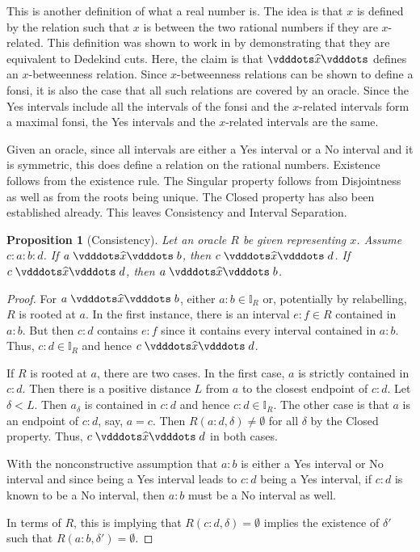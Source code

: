 \documentclass[12pt]{article}
\newtheorem{proposition}{Proposition}[section]
\begin{document}
This is another definition of what a real number is. The idea is that $x$ is defined by the relation such that $x$ is between the two rational numbers if they are $x$-related. This definition was shown to work in \cite{taylor24dedekind} by demonstrating that they are equivalent to Dedekind cuts. Here, the claim is that $\xora$ defines an $x$-betweenness relation. Since $x$-betweenness relations can be shown to define a fonsi, it is also the case that all such relations are covered by an oracle. Since the Yes intervals include all the intervals of the fonsi and the $x$-related intervals form a maximal fonsi, the Yes intervals and the $x$-related intervals are the same. 

Given an oracle, since all intervals are either a Yes interval or a No interval and it is symmetric, this does define a relation on the rational numbers. Existence follows from the existence rule. The Singular property follows from Disjointness as well as from the roots being unique. The Closed property has also been established already. This leaves Consistency and Interval Separation. 

\begin{proposition}[Consistency]
    Let an oracle $R$ be given representing $x$. Assume $c:a:b:d$. If $a \xora b$, then $c \xora d$. If \sout{$c \xora d$}, then \sout{$a \xora b$}. 
\end{proposition}

\begin{proof}
    For $a \xora b$, either $a:b \in \mathbb{I}_R$ or, potentially by relabelling, $R$ is rooted at $a$. In the first instance, there is an interval $e:f \in R$ contained in $a:b$. But then $c:d$ contains $e:f$ since it contains every interval contained in $a:b$. Thus, $c:d \in \mathbb{I}_R$ and hence $c \xora d$. 
    
    If $R$ is rooted at $a$, there are two cases. In the first case, $a$ is strictly contained in $c:d$. Then there is a positive distance $L$ from $a$ to the closest endpoint of $c:d$. Let $\delta < L$. Then $a_\delta$ is contained in $c:d$ and hence $c:d \in \mathbb{I}_R$. The other case is that $a$ is an endpoint of $c:d$, say, $ a= c$. Then $R(a:d, \delta) \neq \emptyset$ for all $\delta$ by the Closed property. Thus, $c \xora d$ in both cases.  

    With the nonconstructive assumption that $a:b$ is either a Yes interval or No interval and since being a Yes interval leads to $c:d$ being a Yes interval, if $c:d$ is known to be a No interval, then $a:b$ must be a No interval as well. 

    In terms of $R$, this is implying that $R(c:d, \delta) = \emptyset$ implies the existence of $\delta'$ such that $R(a:b, \delta') = \emptyset$. 
    
    
\end{proof}
\end{document}

